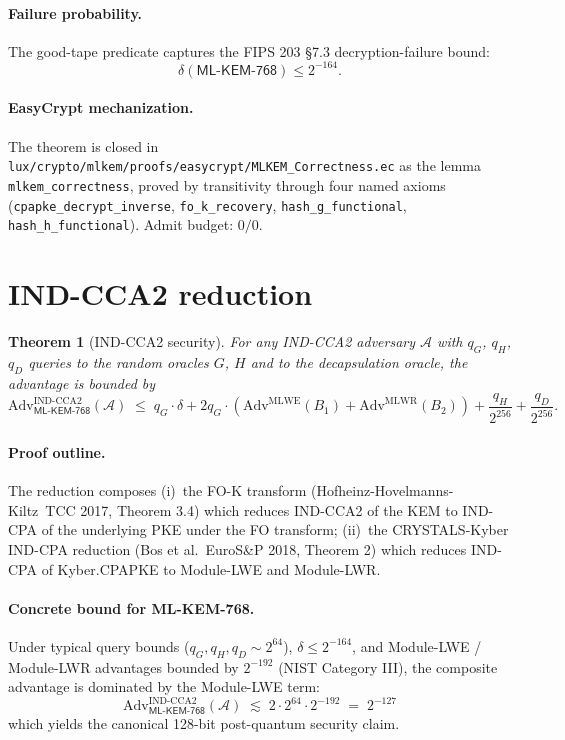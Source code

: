 \documentclass[11pt,a4paper]{article}
\newtheorem{theorem}{Theorem}[section]
\begin{document}
\paragraph{Failure probability.} The good-tape predicate captures
the FIPS 203 \S 7.3 decryption-failure bound:
\[
  \delta(\textsf{ML-KEM-768}) \leq 2^{-164}.
\]

\paragraph{EasyCrypt mechanization.} The theorem is closed in
\texttt{lux/crypto/mlkem/proofs/easycrypt/MLKEM\_Correctness.ec} as
the lemma \texttt{mlkem\_correctness}, proved by transitivity
through four named axioms (\texttt{cpapke\_decrypt\_inverse},
\texttt{fo\_k\_recovery}, \texttt{hash\_g\_functional},
\texttt{hash\_h\_functional}). Admit budget: $0/0$.

\section{IND-CCA2 reduction}\label{sec:indcca2}

\begin{theorem}[IND-CCA2 security]\label{thm:indcca2}
For any IND-CCA2 adversary $\mathcal{A}$ with
$q_G$, $q_H$, $q_D$ queries to the random oracles $G$, $H$ and to
the decapsulation oracle, the advantage is bounded by
\[
  \mathrm{Adv}^{\mathrm{IND}\text{-}\mathrm{CCA2}}_{\textsf{ML-KEM-768}}
    (\mathcal{A})
  \;\leq\;
  q_G \cdot \delta
  + 2 q_G \cdot \left(
      \mathrm{Adv}^{\mathrm{MLWE}}_{}(B_1) +
      \mathrm{Adv}^{\mathrm{MLWR}}_{}(B_2)
    \right)
  + \frac{q_H}{2^{256}}
  + \frac{q_D}{2^{256}}.
\]
\end{theorem}

\paragraph{Proof outline.} The reduction composes (i)~the FO-K
transform (Hofheinz-Hovelmanns-Kiltz~TCC 2017, Theorem 3.4) which
reduces IND-CCA2 of the KEM to IND-CPA of the underlying PKE under
the FO transform; (ii)~the CRYSTALS-Kyber IND-CPA reduction
(Bos et al.~EuroS\&P 2018, Theorem 2) which reduces IND-CPA of
Kyber.CPAPKE to Module-LWE and Module-LWR.

\paragraph{Concrete bound for ML-KEM-768.} Under typical query
bounds ($q_G, q_H, q_D \sim 2^{64}$), $\delta \leq 2^{-164}$, and
Module-LWE / Module-LWR advantages bounded by $2^{-192}$ (NIST
Category III), the composite advantage is dominated by the
Module-LWE term:
\[
  \mathrm{Adv}^{\mathrm{IND}\text{-}\mathrm{CCA2}}_{\textsf{ML-KEM-768}}
    (\mathcal{A})
  \;\lesssim\;
  2 \cdot 2^{64} \cdot 2^{-192}
  \;=\;
  2^{-127}
\]
which yields the canonical 128-bit post-quantum security claim.
\end{document}
